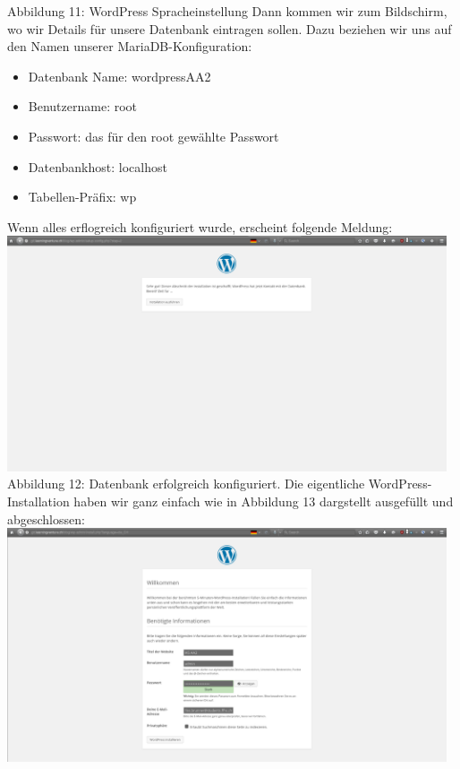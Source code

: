 \documentclass{article}
\begin{document}
	Abbildung 11: WordPress Spracheinstellung
	\newline
	\newline
	Dann kommen wir zum Bildschirm, wo wir Details für unsere Datenbank eintragen sollen. Dazu beziehen wir uns auf den Namen unserer MariaDB-Konfiguration:
	\begin{itemize}
	\item Datenbank Name: wordpressAA2
	\end{itemize}
	\begin{itemize}
	\item Benutzername: root
	\end{itemize}
	\begin{itemize}
	\item Passwort: das für den root gewählte Passwort
	\end{itemize}
	\begin{itemize}
	\item Datenbankhost: localhost
	\end{itemize}
	\begin{itemize}
	\item Tabellen-Präfix: wp
	\end{itemize}
	Wenn alles erflogreich konfiguriert wurde, erscheint folgende Meldung:
	\newline
	\newline
	\includegraphics[width=13cm]{../Pics/37-wordpress-databas_ok}
	Abbildung 12: Datenbank erfolgreich konfiguriert.
	\newline
	\newline
	Die eigentliche WordPress-Installation haben wir ganz einfach wie in Abbildung 13 dargstellt ausgefüllt und abgeschlossen:
	\newline
	\newline
	\includegraphics[width=13cm]{../Pics/38-wordpress-angaben}
\end{document}
